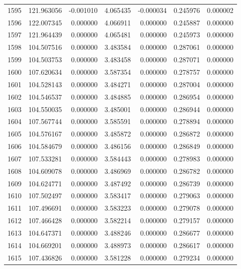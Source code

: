 \begin{tabular}{rrrrrrr}
1595 & 121.963056 &   -0.001010 &  4.065435 &   -0.000034 &    0.245976 &  0.000002 \\
1596 & 122.007345 &    0.000000 &  4.066911 &    0.000000 &    0.245887 &  0.000000 \\
1597 & 121.964439 &    0.000000 &  4.065481 &    0.000000 &    0.245973 &  0.000000 \\
1598 & 104.507516 &    0.000000 &  3.483584 &    0.000000 &    0.287061 &  0.000000 \\
1599 & 104.503753 &    0.000000 &  3.483458 &    0.000000 &    0.287071 &  0.000000 \\
1600 & 107.620634 &    0.000000 &  3.587354 &    0.000000 &    0.278757 &  0.000000 \\
1601 & 104.528143 &    0.000000 &  3.484271 &    0.000000 &    0.287004 &  0.000000 \\
1602 & 104.546537 &    0.000000 &  3.484885 &    0.000000 &    0.286954 &  0.000000 \\
1603 & 104.550035 &    0.000000 &  3.485001 &    0.000000 &    0.286944 &  0.000000 \\
1604 & 107.567744 &    0.000000 &  3.585591 &    0.000000 &    0.278894 &  0.000000 \\
1605 & 104.576167 &    0.000000 &  3.485872 &    0.000000 &    0.286872 &  0.000000 \\
1606 & 104.584679 &    0.000000 &  3.486156 &    0.000000 &    0.286849 &  0.000000 \\
1607 & 107.533281 &    0.000000 &  3.584443 &    0.000000 &    0.278983 &  0.000000 \\
1608 & 104.609078 &    0.000000 &  3.486969 &    0.000000 &    0.286782 &  0.000000 \\
1609 & 104.624771 &    0.000000 &  3.487492 &    0.000000 &    0.286739 &  0.000000 \\
1610 & 107.502497 &    0.000000 &  3.583417 &    0.000000 &    0.279063 &  0.000000 \\
1611 & 107.496691 &    0.000000 &  3.583223 &    0.000000 &    0.279078 &  0.000000 \\
1612 & 107.466428 &    0.000000 &  3.582214 &    0.000000 &    0.279157 &  0.000000 \\
1613 & 104.647371 &    0.000000 &  3.488246 &    0.000000 &    0.286677 &  0.000000 \\
1614 & 104.669201 &    0.000000 &  3.488973 &    0.000000 &    0.286617 &  0.000000 \\
1615 & 107.436826 &    0.000000 &  3.581228 &    0.000000 &    0.279234 &  0.000000 \\

\end{tabular}

